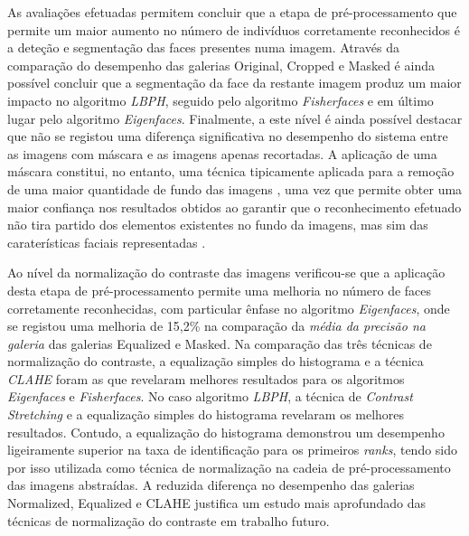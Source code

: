 \documentclass{llncs}
\begin{document}
As avaliações efetuadas permitem concluir que a etapa de pré-processamento que permite um maior aumento no número de indivíduos corretamente reconhecidos é a deteção e segmentação das faces presentes numa imagem. Através da comparação do desempenho das galerias Original, Cropped e Masked é ainda possível concluir que a segmentação da face da restante imagem produz um maior impacto no algoritmo \textit{LBPH}, seguido pelo algoritmo \textit{Fisherfaces} e em último lugar pelo algoritmo \textit{Eigenfaces}. Finalmente, a este nível é ainda possível destacar que não se registou uma diferença significativa no desempenho do sistema entre as imagens com máscara e as imagens apenas recortadas. A aplicação de uma máscara constitui, no entanto, uma técnica tipicamente aplicada para a remoção de uma maior quantidade de fundo das imagens \cite{Phillips2000,ahonen2004face,Kumar2009}, uma vez que permite obter uma maior confiança nos resultados obtidos ao garantir que o reconhecimento efetuado não tira partido dos elementos existentes no fundo da imagens, mas sim das caraterísticas faciais representadas \cite{Kumar2009}.

Ao nível da normalização do contraste das imagens verificou-se que a aplicação desta etapa de pré-processamento permite uma melhoria no número de faces corretamente reconhecidas, com particular ênfase no algoritmo \textit{Eigenfaces}, onde se registou uma melhoria de 15,2\% na comparação da \textit{média da precisão na galeria} das galerias Equalized e Masked. Na comparação das três técnicas de normalização do contraste, a equalização simples do histograma e a técnica \textit{CLAHE} foram as que revelaram melhores resultados para os algoritmos \textit{Eigenfaces} e \textit{Fisherfaces}. No caso algoritmo \textit{LBPH}, a técnica de \textit{Contrast Stretching} e a equalização simples do histograma revelaram os melhores resultados. Contudo, a equalização do histograma demonstrou um desempenho ligeiramente superior na taxa de identificação para os primeiros \textit{ranks}, tendo sido por isso utilizada como técnica de normalização na cadeia de pré-processamento das imagens abstraídas. A reduzida diferença no desempenho das galerias Normalized, Equalized e CLAHE justifica um estudo mais aprofundado das técnicas de normalização do contraste em trabalho futuro.
\end{document}
